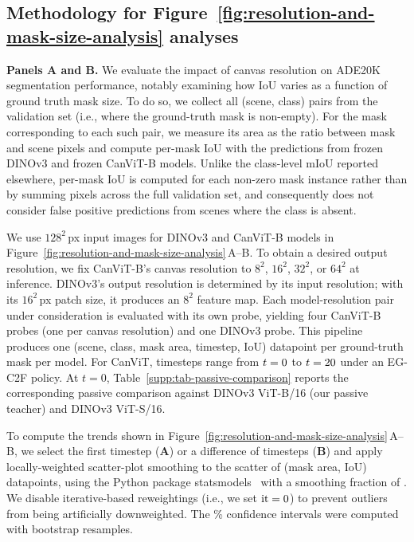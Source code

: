 \documentclass{article}
\begin{document}
\subsection{Methodology for Figure~\ref{fig:resolution-and-mask-size-analysis} analyses}
\label{supp:iou-obj}

\textbf{Panels A and B.} We evaluate the impact of canvas resolution on ADE20K segmentation performance, notably examining how IoU varies as a function of ground truth mask size.
To do so, we collect all (scene, class) pairs from the validation set (i.e., where the ground-truth mask is non-empty).
For the mask corresponding to each such pair, we measure its area as the ratio between mask and scene pixels and compute per-mask IoU with the predictions from frozen DINOv3 and frozen CanViT-B models.
Unlike the class-level mIoU reported elsewhere, per-mask IoU is computed for each non-zero mask instance rather than by summing pixels across the full validation set, and consequently does not consider false positive predictions from scenes where the class is absent.

We use $128^2$\,px input images for DINOv3 and CanViT-B models in Figure~\ref{fig:resolution-and-mask-size-analysis}\,A--B.
To obtain a desired output resolution, we fix CanViT-B's canvas resolution to $8^2$, $16^2$, $32^2$, or $64^2$ at inference.
DINOv3's output resolution is determined by its input resolution; with its $16^2$\,px patch size, it produces an $8^2$ feature map.
Each model-resolution pair under consideration is evaluated with its own probe, yielding four CanViT-B probes (one per canvas resolution) and one DINOv3 probe.
This pipeline produces one (scene, class, mask area, timestep, IoU) datapoint per ground-truth mask per model.
For CanViT, timesteps range from $t = 0$ to $t = 20$ under an EG-C2F policy.
At $t = 0$, Table~\ref{supp:tab-passive-comparison} reports the corresponding passive comparison against DINOv3 ViT-B/16 (our passive teacher) and DINOv3 ViT-S/16.

To compute the trends shown in Figure~\ref{fig:resolution-and-mask-size-analysis}\,A--B, we select the first timestep (\textbf{A}) or a difference of timesteps (\textbf{B}) and apply locally-weighted scatter-plot smoothing to the scatter of (mask area, IoU) datapoints, using the Python package statsmodels~\cite{seabold2010} with a smoothing fraction of \lowessFrac{}. We disable iterative-based reweightings (i.e., we set $\mathrm{it} = 0$) to prevent outliers from being artificially downweighted. The \lowessCiPct\% confidence intervals were computed with \lowessNBoot{} bootstrap resamples.
\end{document}
